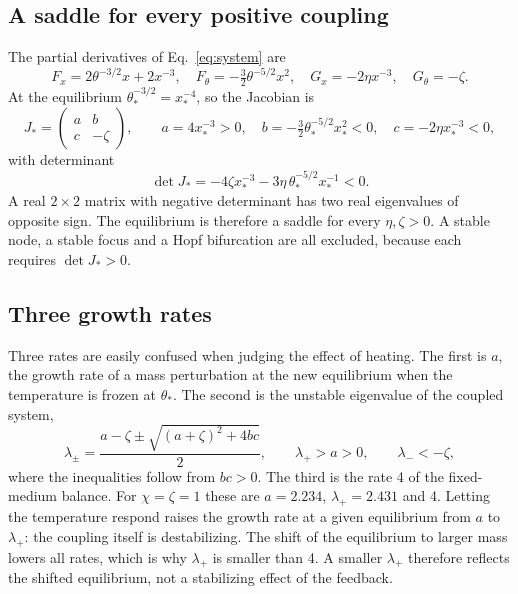 \documentclass[11pt,a4paper]{article}
\begin{document}
\subsection{A saddle for every positive coupling}
The partial derivatives of Eq.~\eqref{eq:system} are
\begin{equation*}
 F_x=2\theta^{-3/2}x+2x^{-3},\quad
 F_\theta=-\tfrac32\theta^{-5/2}x^2,\quad
 G_x=-2\eta x^{-3},\quad
 G_\theta=-\zeta.
\end{equation*}
At the equilibrium $\theta_*^{-3/2}=x_*^{-4}$, so the Jacobian is
\begin{equation*}
 J_*=\begin{pmatrix} a & b\\ c & -\zeta\end{pmatrix},\qquad
 a=4x_*^{-3}>0,\quad
 b=-\tfrac32\theta_*^{-5/2}x_*^2<0,\quad
 c=-2\eta x_*^{-3}<0,
\end{equation*}
with determinant
\begin{equation}
 \det J_*=-4\zeta x_*^{-3}-3\eta\,\theta_*^{-5/2}x_*^{-1}<0.
 \label{eq:det}
\end{equation}
A real $2\times2$ matrix with negative determinant has two real eigenvalues of opposite sign. The equilibrium is therefore a saddle for every $\eta,\zeta>0$. A stable node, a stable focus and a Hopf bifurcation are all excluded, because each requires $\det J_*>0$.

\subsection{Three growth rates}
Three rates are easily confused when judging the effect of heating. The first is $a$, the growth rate of a mass perturbation at the new equilibrium when the temperature is frozen at $\theta_*$. The second is the unstable eigenvalue of the coupled system,
\begin{equation}
 \lambda_\pm=\frac{a-\zeta\pm\sqrt{(a+\zeta)^2+4bc}}{2},\qquad
 \lambda_+>a>0,\qquad \lambda_-<-\zeta,
 \label{eq:eigenvalues}
\end{equation}
where the inequalities follow from $bc>0$. The third is the rate 4 of the fixed-medium balance. For $\chi=\zeta=1$ these are $a=2.234$, $\lambda_+=2.431$ and 4. Letting the temperature respond raises the growth rate at a given equilibrium from $a$ to $\lambda_+$: the coupling itself is destabilizing. The shift of the equilibrium to larger mass lowers all rates, which is why $\lambda_+$ is smaller than 4. A smaller $\lambda_+$ therefore reflects the shifted equilibrium, not a stabilizing effect of the feedback.
\end{document}

